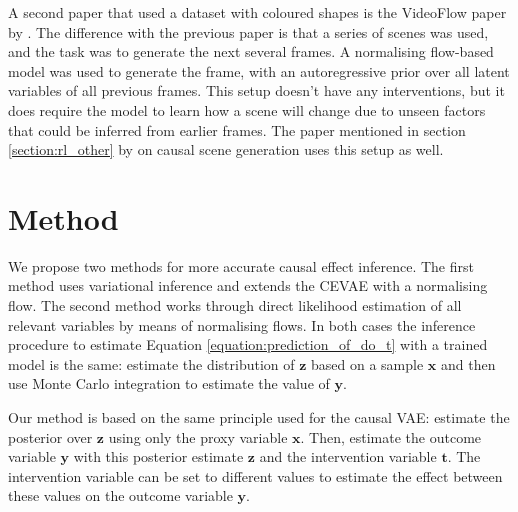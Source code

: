 \documentclass{report}
\newcommand{\bt}{\mathbf{t}}
\newcommand{\bx}{\mathbf{x}}
\newcommand{\by}{\mathbf{y}}
\newcommand{\bz}{\mathbf{z}}
\begin{document}
A second paper that used a dataset with coloured shapes is the VideoFlow paper by \textcite{kumar2019videoflow}. The difference with the previous paper is that a series of scenes was used, and the task was to generate the next several frames. A normalising flow-based model was used to generate the frame, with an autoregressive prior over all latent variables of all previous frames. This setup doesn't have any interventions, but it does require the model to learn how a scene will change due to unseen factors that could be inferred from earlier frames.
The paper mentioned in section \ref{section:rl_other} by \textcite{von2020towards} on causal scene generation uses this setup as well.
 



\chapter{Method}
We propose two methods for more accurate causal effect inference. The first method uses variational inference and extends the CEVAE with a normalising flow. The second method works through direct likelihood estimation of all relevant variables by means of normalising flows. In both cases the inference procedure to estimate Equation \ref{equation:prediction_of_do_t} with a trained model is the same: estimate the distribution of $\bz$ based on a sample $\bx$ and then use Monte Carlo integration to estimate the value of $\by$.

Our method is based on the same principle used for the causal VAE: estimate the posterior over $\bz$ using only the proxy variable $\bx$. Then, estimate the outcome variable $\by$ with this posterior estimate $\bz$ and the intervention variable $\bt$. The intervention variable can be set to different values to estimate the effect between these values on the outcome variable $\by$. 
\end{document}
